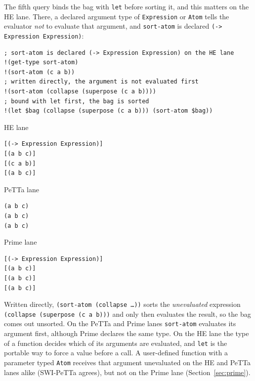 \documentclass[11pt]{article}
\newcommand{\code}[1]{\texttt{#1}}
\newcommand{\outhead}[1]{{\footnotesize\sffamily #1}\par\vspace{1pt}}
\newcommand{\PeTTa}{\textup{PeTTa}}
\newcommand{\HE}{\textup{HE}}
\begin{document}
The fifth query binds the bag with \code{let} before sorting it, and this
matters on the \HE{} lane.  There, a declared argument type of
\code{Expression} or \code{Atom} tells the evaluator \emph{not} to evaluate
that argument, and \code{sort-atom} is declared
\code{(-> Expression Expression)}:

\begin{lstlisting}[style=metta,caption={Argument types decide evaluation on the HE lane},label={lst:t02b}]
; sort-atom is declared (-> Expression Expression) on the HE lane
!(get-type sort-atom)
!(sort-atom (c a b))
; written directly, the argument is not evaluated first
!(sort-atom (collapse (superpose (c a b))))
; bound with let first, the bag is sorted
!(let $bag (collapse (superpose (c a b))) (sort-atom $bag))
\end{lstlisting}
\noindent\begin{minipage}[t]{0.32\textwidth}
\outhead{HE lane}
\begin{lstlisting}[style=out]
[(-> Expression Expression)]
[(a b c)]
[(c a b)]
[(a b c)]
\end{lstlisting}
\end{minipage}\hfill
\begin{minipage}[t]{0.32\textwidth}
\outhead{PeTTa lane}
\begin{lstlisting}[style=out]
%Undefined%
(a b c)
(a b c)
(a b c)
\end{lstlisting}
\end{minipage}\hfill
\begin{minipage}[t]{0.32\textwidth}
\outhead{Prime lane}
\begin{lstlisting}[style=out]
[(-> Expression Expression)]
[(a b c)]
[(a b c)]
[(a b c)]
\end{lstlisting}
\end{minipage}

\noindent
Written directly, \code{(sort-atom (collapse \ldots))} sorts the
\emph{unevaluated} expression \code{(collapse (superpose (c a b)))} and only
then evaluates the result, so the bag comes out unsorted.  On the \PeTTa{}
and Prime lanes \code{sort-atom} evaluates its argument first, although Prime
declares the same type.  On the \HE{}
lane the type of a function decides which of its arguments are evaluated, and
\code{let} is the portable way to force a value before a call.  A
user-defined function with a parameter typed \code{Atom} receives that
argument unevaluated on the \HE{} and \PeTTa{} lanes alike (SWI-\PeTTa{}
agrees), but not on the Prime lane (Section~\ref{sec:prime}).
\end{document}
